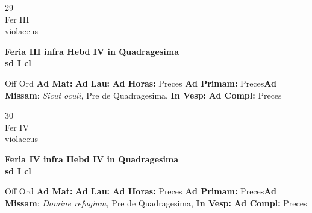 \documentclass[10pt, openany]{book}
\begin{document}
    \begin{center}
        \begin{minipage}{3.5in}
            \vspace{2em}
            \begin{minipage}{0.5in}
                {\Huge 29} \\
                {\normalsize Fer III} \\
                {\normalsize violaceus}
            \end{minipage}
            \begin{minipage}{3.0in}
                \textbf{ \large Feria III infra Hebd IV in Quadragesima  \\
                \textnormal{\normalsize sd I cl}} \\ 
            \end{minipage}
            \begin{justify}Off Ord
                \textbf{Ad Mat: }
                \textbf{Ad Lau: }
                \textbf{Ad Horas: }Preces
                \textbf{Ad Primam: }Preces\textbf{Ad Missam}: \textit{Sicut oculi,} Pre de Quadragesima,  
                \textbf{In Vesp: }
                \textbf{Ad Compl: }Preces
            \end{justify}
        \end{minipage}
    \end{center}

    \begin{center}
        \begin{minipage}{3.5in}
            \vspace{2em}
            \begin{minipage}{0.5in}
                {\Huge 30} \\
                {\normalsize Fer IV} \\
                {\normalsize violaceus}
            \end{minipage}
            \begin{minipage}{3.0in}
                \textbf{ \large Feria IV infra Hebd IV in Quadragesima  \\
                \textnormal{\normalsize sd I cl}} \\ 
            \end{minipage}
            \begin{justify}Off Ord
                \textbf{Ad Mat: }
                \textbf{Ad Lau: }
                \textbf{Ad Horas: }Preces
                \textbf{Ad Primam: }Preces\textbf{Ad Missam}: \textit{Domine refugium,} Pre de Quadragesima,  
                \textbf{In Vesp: }
                \textbf{Ad Compl: }Preces
            \end{justify}
        \end{minipage}
    \end{center}
\end{document}
